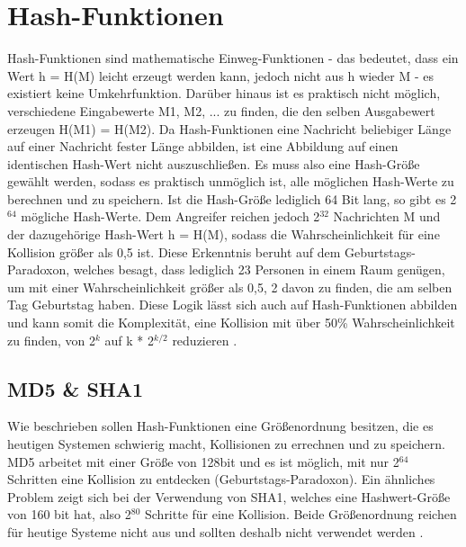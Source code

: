 \documentclass[10pt, a4paper,headsepline,pointednumbers]{scrreprt}
\begin{document}
\section{Hash-Funktionen}
Hash-Funktionen sind mathematische Einweg-Funktionen - das bedeutet, dass ein Wert h = H(M) leicht erzeugt werden kann, jedoch nicht aus h wieder M - es existiert keine Umkehrfunktion. Darüber hinaus ist es praktisch nicht möglich, verschiedene Eingabewerte M1, M2, ... zu finden, die den selben Ausgabewert erzeugen H(M1) = H(M2). Da Hash-Funktionen eine Nachricht beliebiger Länge auf einer Nachricht fester Länge abbilden, ist eine Abbildung auf einen identischen Hash-Wert nicht auszuschließen. Es muss also eine Hash-Größe gewählt werden, sodass es praktisch unmöglich ist, alle möglichen Hash-Werte zu berechnen und zu speichern. Ist die Hash-Größe lediglich 64 Bit lang, so gibt es 2$^{64}$ mögliche Hash-Werte. Dem Angreifer reichen jedoch 2$^{32}$ Nachrichten M und der dazugehörige Hash-Wert h = H(M), sodass die Wahrscheinlichkeit für eine Kollision größer als 0,5 ist. Diese Erkenntnis beruht auf dem Geburtstags-Paradoxon, welches besagt, dass lediglich 23 Personen in einem Raum genügen, um mit einer Wahrscheinlichkeit größer als 0,5, 2 davon zu finden, die am selben Tag Geburtstag haben. Diese Logik lässt sich auch auf Hash-Funktionen abbilden und kann somit die Komplexität, eine Kollision mit über 50\% Wahrscheinlichkeit zu finden, von 2$^{k}$ auf k * 2$^{k/2}$ reduzieren \cite[S. 375ff]{book:it-sicherheit}.

\subsection{MD5 \& SHA1}
Wie beschrieben sollen Hash-Funktionen eine Größenordnung besitzen, die es heutigen Systemen schwierig macht, Kollisionen zu errechnen und zu speichern. MD5 arbeitet mit einer Größe von 128bit und es ist möglich, mit nur 2$^{64}$ Schritten eine Kollision zu entdecken (Geburtstags-Paradoxon). Ein ähnliches Problem zeigt sich bei der Verwendung von SHA1, welches eine Hashwert-Größe von 160 bit hat, also 2$^{80}$ Schritte für eine Kollision. Beide Größenordnung reichen für heutige Systeme nicht aus und sollten deshalb nicht verwendet werden \citep[S.382ff]{book:it-sicherheit} \citep[S. 84ff]{book:practical-crypto} \citep[S. 498ff, 504ff]{book:angewandte-krypto}.
\end{document}
